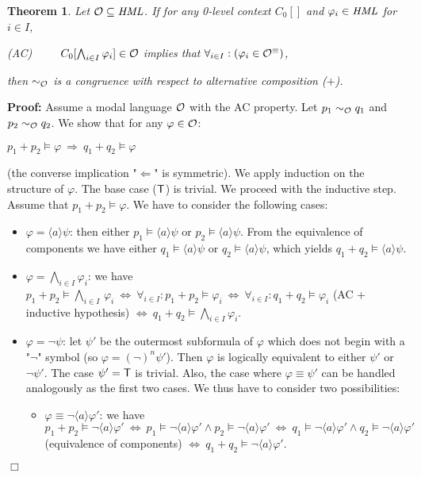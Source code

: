 \documentclass{eptcs}
\def\hmo{{\cal O}}
\def\hml{{\it HML}}
\def\hmeq{\sim_{\cal O}}
\def\iff{\Leftrightarrow}
\def\implies{\Rightarrow}
\def\true{{\sf T}}
\newtheorem{theo}{Theorem}
\newenvironment{theorem}{\begin{theo} \rm }{\end{theo}}
\newenvironment{proof}{\begin{trivlist} \item[\hspace{\labelsep}\bf Proof:]}{\hfill $\Box$ \end{trivlist}}
\def\foralli{\forall_{i \in I}}
\newcommand{\diam}[1]{\langle#1\rangle}
\begin{document}
\begin{theorem} 
Let $\hmo \subseteq \hml$. If for any 0-level context $C_{0}[]$ and $\varphi_i\in \hml$ for $i\in I$,
\begin{center}
(AC)~~~~~$C_{0}[\bigwedge_{i \in I} \varphi_i]\in\hmo$ implies that $\foralli: (\varphi_i \in \hmo^\equiv)$,
\end{center}
then $\hmeq$ is a congruence with respect to alternative composition ($+$).
\end{theorem}
\begin{proof} Assume a modal language $\hmo$ with the AC property. Let $p_1 \hmeq q_1$ and $p_2 \hmeq q_2$. We show that for any $\varphi\in \hmo$:
\begin{center}
$p_1 + p_2 \models \varphi ~\implies~ q_1 + q_2 \models \varphi$
\end{center}
(the converse implication "$\Leftarrow$" is symmetric).  We apply induction on the structure of $\varphi$. The base case ($\true$) is trivial. We proceed with the inductive step. Assume that $p_1 + p_2 \models \varphi$. We have to consider the following cases:
 
\begin{itemize}
\item $\varphi = \diam{a} \psi$: then either $p_1 \models \diam{a} \psi$ or $p_2 \models \diam{a} \psi$. From the equivalence of components we have either $q_1 \models \diam{a} \psi$ or $q_2 \models \diam{a} \psi$, which yields $q_1 + q_2 \models \diam{a} \psi$.

\item $\varphi = \bigwedge_{i \in I} \varphi_i$: we have $p_1 + p_2 \models \bigwedge_{i \in I}\, \varphi_i ~\iff~ \forall_{i \in I}: p_1 + p_2 \models \varphi_i ~\iff~ \forall_{i \in I}: q_1 + q_2 \models \varphi_i$ (AC + inductive hypothesis) $ \iff~ q_1 + q_2 \models \bigwedge_{i \in I} \varphi_i$.

\item $\varphi = \neg \psi$: let $\psi'$ be the outermost subformula of $\varphi$ which does not begin with a "$\neg$" symbol (so $\varphi = (\neg)^{n} \psi'$). Then $\varphi$ is logically equivalent to either $\psi'$ or $\neg \psi'$. The case $\psi' = \true$ is trivial. Also, the case where $\varphi \equiv \psi'$ can be handled analogously as the first two cases. We thus have to consider two possibilities:

\begin{itemize}
\item $\varphi \equiv \neg \diam{a} \varphi'$: we have $p_1 + p_2 \models \neg \diam{a} \varphi' ~\iff~ p_1 \models \neg \diam{a} \varphi' \wedge p_2 \models \neg \diam{a} \varphi' ~\iff~ q_1 \models \neg \diam{a} \varphi' \wedge q_2 \models \neg \diam{a} \varphi'$ (equivalence of components) $\iff~q_1 + q_2 \models \neg \diam{a} \varphi'$.


\end{itemize}
\end{itemize}
\end{proof}
\end{document}
